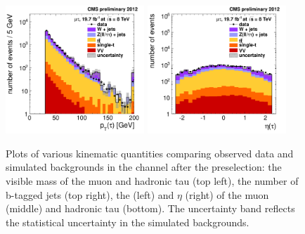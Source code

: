 \begin{figure}[hbtp]
\begin{center}
    \includegraphics[width=0.465\textwidth]{figures/mutau/preselection/pttau.pdf}
    \includegraphics[width=0.465\textwidth]{figures/mutau/preselection/etatau.pdf}
    \caption{Plots of various kinematic quantities comparing observed data and simulated backgrounds in the \mutau channel after the preselection: the visible mass of the muon and hadronic tau (top left), the number of b-tagged jets (top right), the \pt (left) and $\eta$ (right) of the muon (middle) and hadronic tau (bottom). The uncertainty band reflects the statistical uncertainty in the simulated backgrounds.}
    \label{fig:preselmutau}
  \end{center}
\end{figure}

